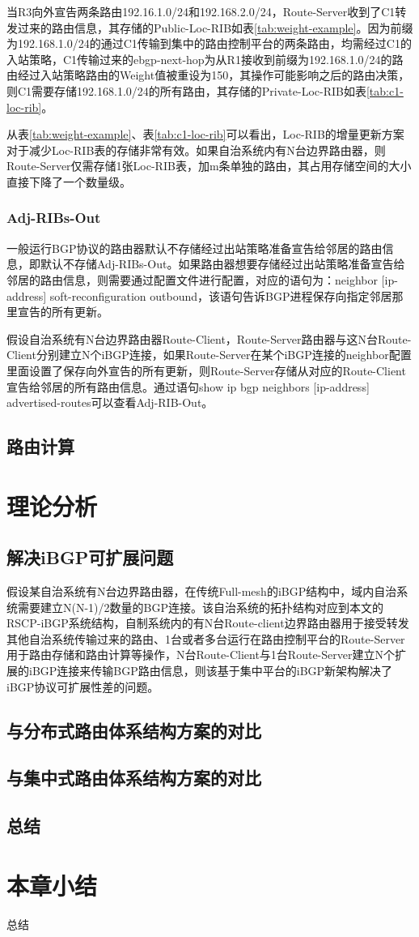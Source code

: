 当R3向外宣告两条路由192.16.1.0/24和192.168.2.0/24，Route-Server收到了C1转发过来的路由信息，其存储的Public-Loc-RIB如表\ref{tab:weight-example}。因为前缀为192.168.1.0/24的通过C1传输到集中的路由控制平台的两条路由，均需经过C1的入站策略，C1传输过来的ebgp-next-hop为从R1接收到前缀为192.168.1.0/24的路由经过入站策略路由的Weight值被重设为150，其操作可能影响之后的路由决策，则C1需要存储192.168.1.0/24的所有路由，其存储的Private-Loc-RIB如表\ref{tab:c1-loc-rib}。


从表\ref{tab:weight-example}、表\ref{tab:c1-loc-rib}可以看出，Loc-RIB的增量更新方案对于减少Loc-RIB表的存储非常有效。如果自治系统内有N台边界路由器，则Route-Server仅需存储1张Loc-RIB表，加m条单独的路由，其占用存储空间的大小直接下降了一个数量级。


\subsubsection{Adj-RIBs-Out}
一般运行BGP协议的路由器默认不存储经过出站策略准备宣告给邻居的路由信息，即默认不存储Adj-RIBs-Out。如果路由器想要存储经过出站策略准备宣告给邻居的路由信息，则需要通过配置文件进行配置，对应的语句为：neighbor [ip-address] soft-reconfiguration outbound，该语句告诉BGP进程保存向指定邻居那里宣告的所有更新。


假设自治系统有N台边界路由器Route-Client，Route-Server路由器与这N台Route-Client分别建立N个iBGP连接，如果Route-Server在某个iBGP连接的neighbor配置里面设置了保存向外宣告的所有更新，则Route-Server存储从对应的Route-Client宣告给邻居的所有路由信息。通过语句show ip bgp neighbors [ip-address] advertised-routes可以查看Adj-RIB-Out。


\subsection{路由计算}
\section{理论分析}
\subsection{解决iBGP可扩展问题}
假设某自治系统有N台边界路由器，在传统Full-mesh的iBGP结构中，域内自治系统需要建立N(N-1)/2数量的BGP连接。该自治系统的拓扑结构对应到本文的RSCP-iBGP系统结构，自制系统内的有N台Route-client边界路由器用于接受转发其他自治系统传输过来的路由、1台或者多台运行在路由控制平台的Route-Server用于路由存储和路由计算等操作，N台Route-Client与1台Route-Server建立N个扩展的iBGP连接来传输BGP路由信息，则该基于集中平台的iBGP新架构解决了iBGP协议可扩展性差的问题。


\subsection{与分布式路由体系结构方案的对比}
\subsection{与集中式路由体系结构方案的对比}
\subsection{总结}

\section{本章小结}
总结